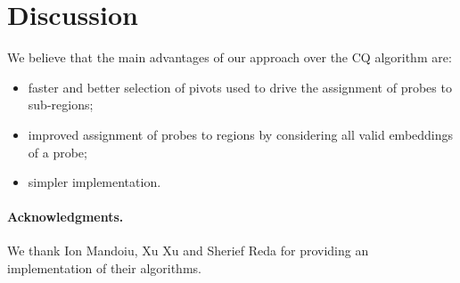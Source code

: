 \documentclass[runningheads]{llncs}
\begin{document}
\section{Discussion}
\label{sec:discuss}

We believe that the main advantages of our
approach over the CQ algorithm are:

\begin{itemize}
\item faster and better selection of pivots used to drive
the assignment of probes to sub-regions;
\item improved assignment of probes to regions by considering all valid embeddings
of a probe;
\item simpler implementation.
\end{itemize}

\paragraph{Acknowledgments.}We thank Ion Mandoiu, Xu Xu and Sherief Reda for
providing an implementation of their algorithms.
\end{document}
